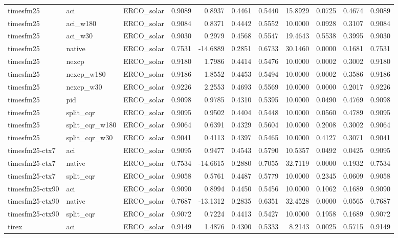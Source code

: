 \begin{tabular}{lllrrrrrrrr}
timesfm25 & aci & ERCO_solar & 0.9089 & 0.8937 & 0.4461 & 0.5440 & 15.8929 & 0.0725 & 0.4674 & 0.9089 \\
timesfm25 & aci_w180 & ERCO_solar & 0.9084 & 0.8371 & 0.4442 & 0.5552 & 10.0000 & 0.0928 & 0.3107 & 0.9084 \\
timesfm25 & aci_w30 & ERCO_solar & 0.9030 & 0.2979 & 0.4568 & 0.5547 & 19.4643 & 0.5538 & 0.3995 & 0.9030 \\
timesfm25 & native & ERCO_solar & 0.7531 & -14.6889 & 0.2851 & 0.6733 & 30.1460 & 0.0000 & 0.1681 & 0.7531 \\
timesfm25 & nexcp & ERCO_solar & 0.9180 & 1.7986 & 0.4414 & 0.5476 & 10.0000 & 0.0002 & 0.3002 & 0.9180 \\
timesfm25 & nexcp_w180 & ERCO_solar & 0.9186 & 1.8552 & 0.4453 & 0.5494 & 10.0000 & 0.0002 & 0.3586 & 0.9186 \\
timesfm25 & nexcp_w30 & ERCO_solar & 0.9226 & 2.2553 & 0.4693 & 0.5569 & 10.0000 & 0.0000 & 0.2017 & 0.9226 \\
timesfm25 & pid & ERCO_solar & 0.9098 & 0.9785 & 0.4310 & 0.5395 & 10.0000 & 0.0490 & 0.4769 & 0.9098 \\
timesfm25 & split_cqr & ERCO_solar & 0.9095 & 0.9502 & 0.4404 & 0.5448 & 10.0000 & 0.0560 & 0.4789 & 0.9095 \\
timesfm25 & split_cqr_w180 & ERCO_solar & 0.9064 & 0.6391 & 0.4329 & 0.5604 & 10.0000 & 0.2008 & 0.3002 & 0.9064 \\
timesfm25 & split_cqr_w30 & ERCO_solar & 0.9041 & 0.4113 & 0.4397 & 0.5465 & 10.0000 & 0.4127 & 0.3071 & 0.9041 \\
timesfm25-ctx7 & aci & ERCO_solar & 0.9095 & 0.9477 & 0.4543 & 0.5790 & 10.5357 & 0.0492 & 0.0425 & 0.9095 \\
timesfm25-ctx7 & native & ERCO_solar & 0.7534 & -14.6615 & 0.2880 & 0.7055 & 32.7119 & 0.0000 & 0.1932 & 0.7534 \\
timesfm25-ctx7 & split_cqr & ERCO_solar & 0.9058 & 0.5761 & 0.4487 & 0.5779 & 10.0000 & 0.2345 & 0.0609 & 0.9058 \\
timesfm25-ctx90 & aci & ERCO_solar & 0.9090 & 0.8994 & 0.4450 & 0.5456 & 10.0000 & 0.1062 & 0.1689 & 0.9090 \\
timesfm25-ctx90 & native & ERCO_solar & 0.7687 & -13.1312 & 0.2835 & 0.6351 & 32.4528 & 0.0000 & 0.0565 & 0.7687 \\
timesfm25-ctx90 & split_cqr & ERCO_solar & 0.9072 & 0.7224 & 0.4413 & 0.5427 & 10.0000 & 0.1958 & 0.1689 & 0.9072 \\
tirex & aci & ERCO_solar & 0.9149 & 1.4876 & 0.4300 & 0.5333 & 8.2143 & 0.0025 & 0.5715 & 0.9149 \\

\end{tabular}
